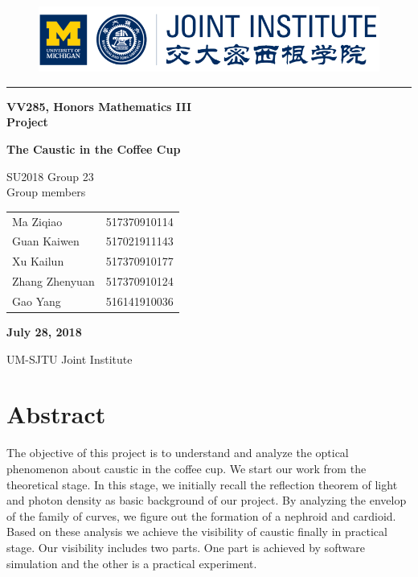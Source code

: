 \documentclass[a4paper]{article}
\begin{document}
\begin{titlepage}
\begin{figure}[!htbp]
\center
\includegraphics[width=12cm]{ji_logo.png}
\end{figure}
\noindent\rule[0.25\baselineskip]{\textwidth}{1pt}
\begin{center}
\Large{\bfseries  VV285, Honors Mathematics III \\Project}
\vspace{1cm}

\Huge{\bfseries The Caustic in the Coffee Cup}

\vspace{1.5cm}

\Large SU2018  Group 23\\

\vspace{1cm}
\Large Group members\\

\begin{tabular}{l l}
Ma Ziqiao & 517370910114\\
Guan Kaiwen & 517021911143\\
Xu Kailun & 517370910177\\
Zhang Zhenyuan & 517370910124\\
Gao Yang & 516141910036\\
\end{tabular}

\vspace{2cm}
{\bfseries July 28, 2018}\\
\vspace{2cm}

UM-SJTU Joint Institute
\end{center}
\end{titlepage}
\section{Abstract}
The objective of this project is to understand and analyze the optical phenomenon about caustic in the coffee cup. We start our work from the theoretical stage. In this stage, we initially recall the reflection theorem of light and photon density as basic background of our project. By analyzing the envelop of the family of curves, we figure out the formation of a nephroid and cardioid. Based on these analysis we achieve the visibility of caustic finally in practical stage. Our visibility includes two parts. One part is achieved by software simulation and the other is a practical experiment.
    
\end{document}
